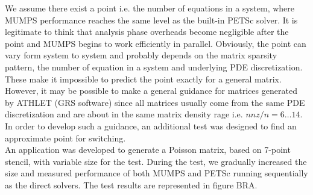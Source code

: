 We assume there exist a point i.e. the number of equations in a system, where MUMPS performance reaches the same level as the built-in PETSc solver. It is legitimate to think that analysis phase overheads become negligible after the point and MUMPS begins to work efficiently in parallel. Obviously, the point can vary form system to system and probably depends on the matrix sparsity pattern, the number of equation in a system and underlying PDE discretization. These make it impossible to predict the point exactly for a general matrix. However, it may be possible to make a general guidance for matrices generated by ATHLET (GRS software) since all matrices usually come from the same PDE discretization and are about in the same matrix density rage i.e. $nnz / n = {6 \dots 14}$. In order to develop such a guidance, an additional test was designed to find an approximate point for switching.\\


An application was developed to generate a Poisson matrix, based on 7-point stencil, with variable size for the test. During the test, we gradually increased the size and measured performance of both MUMPS and PETSc running sequentially as the direct solvers. The test results are represented in figure BRA.\\






